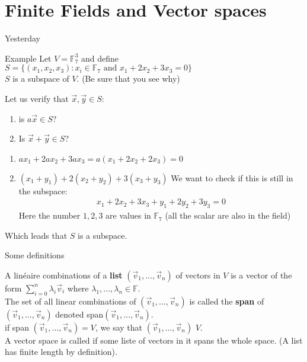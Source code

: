 \section{Finite Fields and Vector spaces}



\begin{parag}{Yesterday}
    
    \begin{subparag}{Example}
        Let $V =  \mathbb{F}_7^3$ and define $S =  \{\left(x_1, x_2, x_3\right): x_i \in \mathbb{F}_7 \text{ and } x_1 + 2x_2 + 3x_3 = 0\}$\\
        $S$ is a subspace of $V$. (Be sure that you see why)
    \end{subparag}
    Let us verify that $\vec{x}, \vec{y} \in S$:\\
    \begin{enumerate}
        \item is $a\vec{x} \in S$?
        \item Is $\vec{x} + \vec{y} \in S$?
    \end{enumerate}
    \begin{enumerate}
        \item $ax_1 + 2ax_2 + 3ax_3 = a\left(x_1 + 2x_2 + 2x_3\right) =  0$
        \item $\left(x_1 + y_1\right) + 2\left(x_2 + y_2\right) + 3\left(x_3 + y_3\right)$ We want to check if this is still in the subspace:
            \begin{align*} 
                x_1 + 2x_2 + 3x_3 + y_1 + 2y_2 + 3y_3 = 0
            \end{align*}
            Here the number $1, 2, 3$ are values in $\mathbb{F}_7$ (all the scalar are also in the field)
    \end{enumerate}
    Which leads that $S$ is a subspace.
\end{parag}
\begin{parag}{Some definitions }
    \begin{definition}
    A linéaire combinations of a \textbf{list} $\left(\vec{v}_1, \ldots, \vec{v}_n\right)$ of vectors in $V$ is a vector of the form $\sum_{i = 0}^{n} \lambda_i \vec{v}_i$ where $\lambda_1, \ldots, \lambda_n \in \mathbb{F}$.\\
    The set of all linear combinations of $\left(\vec{v}_1, \ldots, \vec{v}_n\right)$ is called the \textbf{span} of $\left(\vec{v}_1, \ldots, \vec{v}_n\right)$ denoted span$\left(\vec{v}_1, \ldots, \vec{v}_n\right)$.\\
if span $\left(\vec{v}_1, \ldots, \vec{v}_n\right) =  V$, we say that $\left(\vec{v}_1, \ldots, \vec{v}_n\right)$  $V$.\\
A vector space is called  if some liste of vectors in it spans the whole space. (A list has finite length by definition).
    \end{definition}
\end{parag}

